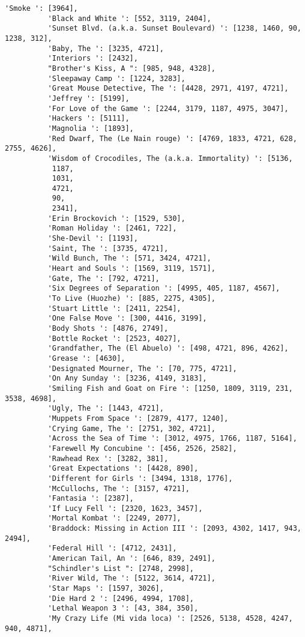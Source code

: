 \documentclass[11pt]{article}
\begin{document}
\begin{Verbatim}[commandchars=\\\{\}]
          'Smoke ': [3964],
          'Black and White ': [552, 3119, 2404],
          'Sunset Blvd. (a.k.a. Sunset Boulevard) ': [1238, 1460, 90, 1238, 312],
          'Baby, The ': [3235, 4721],
          'Interiors ': [2432],
          "Brother's Kiss, A ": [985, 948, 4328],
          'Sleepaway Camp ': [1224, 3283],
          'Great Mouse Detective, The ': [4428, 2971, 4197, 4721],
          'Jeffrey ': [5199],
          'For Love of the Game ': [2244, 3179, 1187, 4975, 3047],
          'Hackers ': [5111],
          'Magnolia ': [1893],
          'Red Dwarf, The (Le Nain rouge) ': [4769, 1833, 4721, 628, 2755, 4626],
          'Wisdom of Crocodiles, The (a.k.a. Immortality) ': [5136,
           1187,
           1031,
           4721,
           90,
           2341],
          'Erin Brockovich ': [1529, 530],
          'Roman Holiday ': [2461, 722],
          'She-Devil ': [1193],
          'Saint, The ': [3735, 4721],
          'Wild Bunch, The ': [571, 3424, 4721],
          'Heart and Souls ': [1569, 3119, 1571],
          'Gate, The ': [792, 4721],
          'Six Degrees of Separation ': [4995, 405, 1187, 4567],
          'To Live (Huozhe) ': [885, 2275, 4305],
          'Stuart Little ': [2411, 2254],
          'One False Move ': [300, 4416, 3199],
          'Body Shots ': [4876, 2749],
          'Bottle Rocket ': [2523, 4027],
          'Grandfather, The (El Abuelo) ': [498, 4721, 896, 4262],
          'Grease ': [4630],
          'Designated Mourner, The ': [70, 775, 4721],
          'On Any Sunday ': [3236, 4149, 3183],
          'Smiling Fish and Goat on Fire ': [1250, 1809, 3119, 231, 3538, 4698],
          'Ugly, The ': [1443, 4721],
          'Muppets From Space ': [2879, 4177, 1240],
          'Crying Game, The ': [2751, 302, 4721],
          'Across the Sea of Time ': [3012, 4975, 1766, 1187, 5164],
          'Farewell My Concubine ': [456, 2526, 2582],
          'Rawhead Rex ': [3282, 381],
          'Great Expectations ': [4428, 890],
          'Different for Girls ': [3494, 1318, 1776],
          'McCullochs, The ': [3157, 4721],
          'Fantasia ': [2387],
          'If Lucy Fell ': [2320, 1623, 3457],
          'Mortal Kombat ': [2249, 2077],
          'Braddock: Missing in Action III ': [2093, 4302, 1417, 943, 2494],
          'Federal Hill ': [4712, 2431],
          'American Tail, An ': [646, 839, 2491],
          "Schindler's List ": [2748, 2998],
          'River Wild, The ': [5122, 3614, 4721],
          'Star Maps ': [1597, 3026],
          'Die Hard 2 ': [2496, 4994, 1708],
          'Lethal Weapon 3 ': [43, 384, 350],
          'My Crazy Life (Mi vida loca) ': [2526, 5138, 4528, 4247, 940, 4871],

\end{Verbatim}
\end{document}

